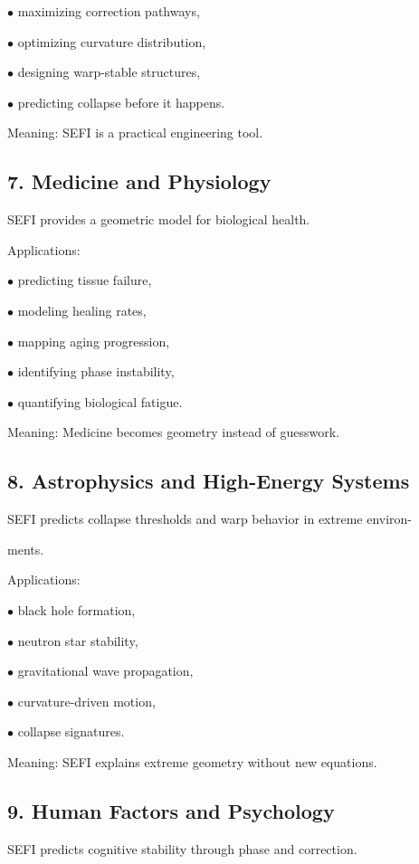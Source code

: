 \documentclass[10pt]{article}
\begin{document}
\noindent $\bullet$ maximizing correction pathways,

\noindent $\bullet$ optimizing curvature distribution,

\noindent $\bullet$ designing warp-stable structures,

\noindent $\bullet$ predicting collapse before it happens.

Meaning: SEFI is a practical engineering tool.


\subsection*{7. Medicine and Physiology}
SEFI provides a geometric model for biological health.

Applications:

\noindent $\bullet$ predicting tissue failure,

\noindent $\bullet$ modeling healing rates,

\noindent $\bullet$ mapping aging progression,

\noindent $\bullet$ identifying phase instability,

\noindent $\bullet$ quantifying biological fatigue.

Meaning: Medicine becomes geometry instead of guesswork.

\subsection*{8. Astrophysics and High-Energy Systems}
SEFI predicts collapse thresholds and warp behavior in extreme environ-

ments.

Applications:

\noindent $\bullet$ black hole formation,

\noindent $\bullet$ neutron star stability,

\noindent $\bullet$ gravitational wave propagation,

\noindent $\bullet$ curvature-driven motion,

\noindent $\bullet$ collapse signatures.

Meaning: SEFI explains extreme geometry without new equations.

\subsection*{9. Human Factors and Psychology}
SEFI predicts cognitive stability through phase and correction.
\end{document}
